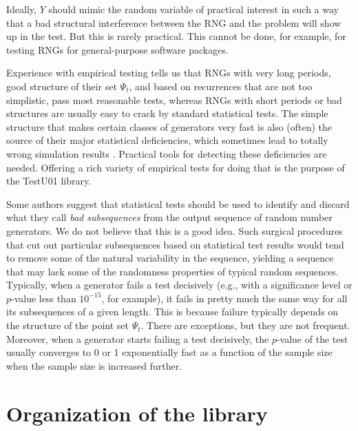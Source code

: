 Ideally, $Y$ should mimic the random variable of practical interest
in such a way that a bad structural interference between the RNG and the
problem will show up in the test.
But this is rarely practical.
This cannot be done, for example, for testing RNGs
for general-purpose software packages.

Experience with empirical testing tells us that RNGs with very long
periods, good structure of their set $\Psi_t$, and based on recurrences
that are not too simplistic, pass most reasonable tests,
whereas RNGs with short periods or bad structures are usually easy
to crack by standard statistical tests.
The simple structure that makes certain classes of 
generators very fast is also
(often) the source of their major statistical deficiencies,
which sometimes lead to totally wrong simulation results
\cite{rCOU94a,rLEC02c,rLEC00c,rLEC01a,rLEC01d,rFER92a,rTEZ93a}.
Practical tools for detecting these deficiencies are needed.  
Offering a rich variety of empirical tests for doing that is
the purpose of the {TestU01} library.

Some authors suggest that statistical tests should be used to identify
and discard what they call {\em bad subsequences\/} from the output
sequence of random number generators.  
We do not believe that this is a good idea.
Such surgical procedures that cut out particular subsequences based on
statistical test results would tend to remove some of the natural
variability in the sequence, yielding a sequence that may lack some of
the randomness properties of typical random sequences.
Typically, when a generator fails a test decisively (e.g., with a 
significance level or $p$-value less than $10^{-15}$, for example), 
it fails in pretty much the same way for all its subsequences 
of a given length.
This is because failure typically depends on the structure of the point
set $\Psi_t$.  There are exceptions, but they are not frequent.
Moreover, when a generator starts failing a test decisively, the $p$-value
of the test usually converges to 0 or 1 exponentially fast as a function
of the sample size when the sample size is increased further.

\section {Organization of the library}


